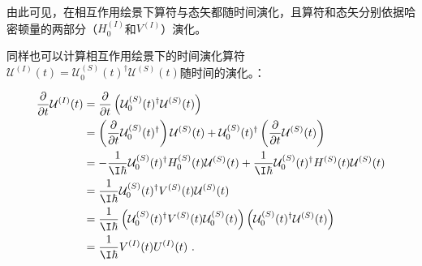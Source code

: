 由此可见，在相互作用绘景下算符与态矢都随时间演化，且算符和态矢分别依据哈密顿量的两部分（$H_0^{(I)}$和$V^{(I)}$）演化。

同样也可以计算相互作用绘景下的时间演化算符$\mathcal U^{(I)}(t)=\mathcal U^{(S)}_0(t)^\dagger\mathcal U^{(S)}(t)$随时间的演化。：

\begin{equation}
\begin{aligned}
\frac{\partial}{\partial t}\mathcal U^{(I)}(t)&=
\frac{\partial}{\partial t}\left(\mathcal U^{(S)}_0(t)^\dagger\mathcal U^{(S)}(t)\right)\\
&=\left(\frac{\partial}{\partial t}\mathcal U^{(S)}_0(t)^\dagger\right)\mathcal U^{(S)}(t)+\mathcal U^{(S)}_0(t)^\dagger\left(\frac{\partial}{\partial t}\mathcal U^{(S)}(t)\right) \\
&=-\frac{1}{\I\hbar}\mathcal U^{(S)}_0(t)^\dagger H^{(S)}_0(t)\mathcal U^{(S)}(t)+\frac{1}{\I\hbar}\mathcal U^{(S)}_0(t)^\dagger H^{(S)}(t)\mathcal U^{(S)}(t)  \\
&=\frac{1}{\I\hbar}\mathcal U^{(S)}_0(t)^\dagger V^{(S)}(t)\mathcal U^{(S)}(t)  \\
&=\frac{1}{\I\hbar}\left(\mathcal U^{(S)}_0(t)^\dagger V^{(S)}(t)\mathcal U^{(S)}_0(t)\right)\left(\mathcal U^{(S)}_0(t)^\dagger\mathcal U^{(S)}(t) \right) \\
&=\frac{1}{\I\hbar}V^{(I)}(t)U^{(I)}(t)~.
\end{aligned}
\end{equation}

